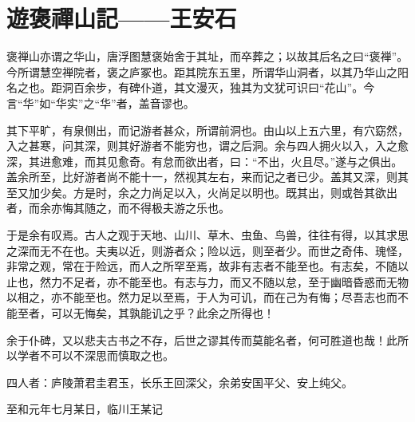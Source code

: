 \section{ 遊褒禪山記——王安石}

褒禅山亦谓之华山，唐浮图慧褒始舍于其址，而卒葬之；以故其后名之曰“褒禅”。今所谓慧空禅院者，褒之庐冢也。距其院东五里，所谓华山洞者，以其乃华山之阳名之也。距洞百余步，有碑仆道，其文漫灭，独其为文犹可识曰“花山”。今言“华”如“华实”之“华”者，盖音谬也。

其下平旷，有泉侧出，而记游者甚众，所谓前洞也。由山以上五六里，有穴窈然，入之甚寒，问其深，则其好游者不能穷也，谓之后洞。余与四人拥火以入，入之愈深，其进愈难，而其见愈奇。有怠而欲出者，曰：“不出，火且尽。”遂与之俱出。盖余所至，比好游者尚不能十一，然视其左右，来而记之者已少。盖其又深，则其至又加少矣。方是时，余之力尚足以入，火尚足以明也。既其出，则或咎其欲出者，而余亦悔其随之，而不得极夫游之乐也。

于是余有叹焉。古人之观于天地、山川、草木、虫鱼、鸟兽，往往有得，以其求思之深而无不在也。夫夷以近，则游者众；险以远，则至者少。而世之奇伟、瑰怪，非常之观，常在于险远，而人之所罕至焉，故非有志者不能至也。有志矣，不随以止也，然力不足者，亦不能至也。有志与力，而又不随以怠，至于幽暗昏惑而无物以相之，亦不能至也。然力足以至焉，于人为可讥，而在己为有悔；尽吾志也而不能至者，可以无悔矣，其孰能讥之乎？此余之所得也！

余于仆碑，又以悲夫古书之不存，后世之谬其传而莫能名者，何可胜道也哉！此所以学者不可以不深思而慎取之也。

四人者：庐陵萧君圭君玉，长乐王回深父，余弟安国平父、安上纯父。

至和元年七月某日，临川王某记